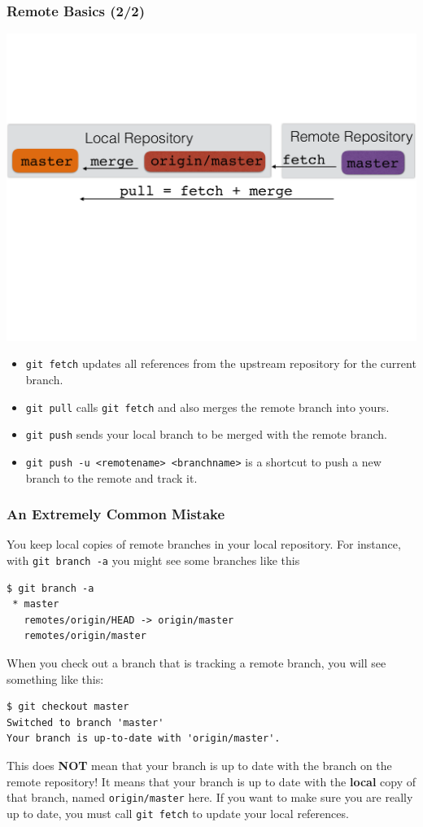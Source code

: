 \documentclass{beamer}
\begin{document}
\begin{frame}[fragile]
\frametitle{Remote Basics (2/2)}
\includegraphics[width=\textwidth]{fetchcartoon}
\begin{itemize}
\item \lstinline{git fetch} updates all references from the upstream repository for the current branch.
\item \lstinline{git pull} calls \lstinline{git fetch} and also merges the remote branch into yours.
\item \lstinline{git push} sends your local branch to be merged with the remote branch.
\item \lstinline{git push -u <remotename> <branchname>} is a shortcut to push a new branch to the remote and track it.
\end{itemize}
\end{frame}

\begin{frame}[fragile]
\frametitle{An Extremely Common Mistake}
You keep local copies of remote branches in your local repository. For instance, with \lstinline{git branch -a} you might see some branches like this
\begin{lstlisting}
$ git branch -a
 * master
   remotes/origin/HEAD -> origin/master
   remotes/origin/master
\end{lstlisting}
When you check out a branch that is tracking a remote branch, you will see something like this:
\begin{lstlisting}
$ git checkout master
Switched to branch 'master'
Your branch is up-to-date with 'origin/master'.
\end{lstlisting}
This does \textbf{NOT} mean that your branch is up to date with the branch on the remote repository! It means that your branch is up to date with the \textbf{local} copy of that branch, named \lstinline{origin/master} here.
If you want to make sure you are really up to date, you must call \lstinline{git fetch} to update your local references.
\end{frame}
\end{document}
